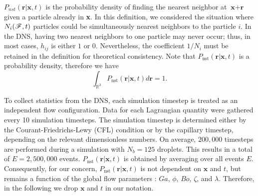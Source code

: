$P_{nst}(\textbf{r}|\textbf{x},t)$ is the probability density of finding the nearest neighbor at $\textbf{x}+\textbf{r}$ given a particle already in \textbf{x}.
In this definition, we considered the situation where $N_i(\mathscr{F},t)$ particles could be simultaneously nearest neighbors to the particle $i$. 
In the DNS, having two nearest neighbors to one particle may never occur; thus, in most cases, $h_{ij}$ is either $1$ or $0$. 
Nevertheless, the coefficient $1/N_i$ must be retained in the definition for theoretical consistency.
Note that $P_\text{nst}(\textbf{r}|\textbf{x},t)$ is a probability density, therefore we have
\begin{equation*}
    \int_{\mathbb{R}^3}
     P_\text{nst}(\textbf{r}|\textbf{x},t) d\textbf{r}  = 1. 
    \label{eq:Pnst}
\end{equation*}



To collect statistics from the DNS, each simulation timestep is treated as an independent flow configuration. 
Data for each Lagrangian quantity were gathered every 10 simulation timesteps. 
The simulation timestep is determined either by the Courant-Friedrichs-Lewy (CFL) condition or by the capillary timestep, depending on the relevant dimensionless numbers.
On average, $200,000$ timesteps are performed during a simulation with $N_b = 125$ droplets. 
This results in a total of $E = 2,500,000$ events.
$P_\text{nst}(\textbf{r}|\textbf{x},t)$ is obtained by averaging over all events $E$. 
Consequently, for our concern, $P_\text{nst}(\textbf{r}|\textbf{x},t)$ is not dependent on $\mathbf{x}$ and $t$, but remains a function of the global flow parameters :  $Ga$, $\phi$, $Bo$, $\zeta$, and $\lambda$.
Therefore, in the following we drop $\mathbf{x}$ and $t$ in our notation. 

